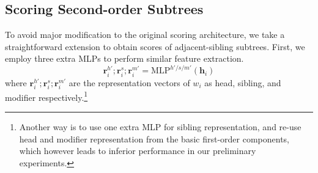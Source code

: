 \subsection{Scoring Second-order Subtrees}
To avoid major modification to the original scoring architecture,
we take a straightforward extension to obtain scores of adjacent-sibling subtrees.
First, we employ three extra MLPs to perform similar feature extraction.
\begin{equation}
    \label{mlp-sib}
    \mathbf{r}_i^{h'}; \mathbf{r}_i^{s}; \mathbf{r}_i^{m'} =\mathrm{MLP}^{h'/s/m'} \left( \mathbf{h}_i \right)
\end{equation}
where $\mathbf{r}_i^{h'}; \mathbf{r}_i^{s}; \mathbf{r}_i^{m'}$ are the representation vectors of $w_i$ as
head, sibling, and modifier respectively.\footnote{
    Another way is to use one extra MLP for sibling representation, and re-use head and modifier representation from the basic first-order components, which however leads to inferior performance
    in our preliminary experiments.
}



